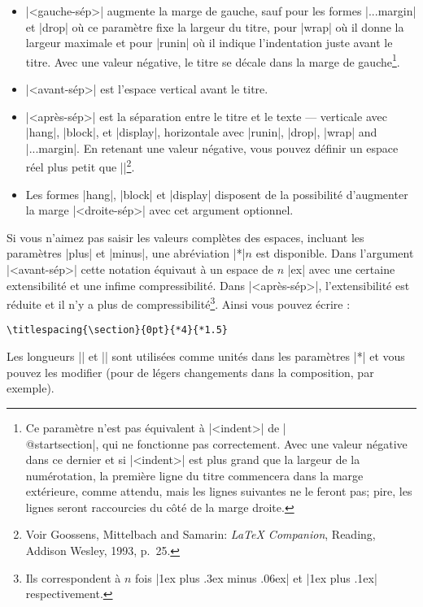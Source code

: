 \documentclass[a4paper]{ltxguide}
\def\gobble#1{}
\def\cs#1{\expandafter\gobble\string\\#1}
\begin{document}
\begin{itemize}
\item |<gauche-sép>| augmente la marge de gauche, sauf pour les formes
|...margin| et |drop| où ce paramètre fixe la largeur du titre, pour |wrap| où
il donne la largeur maximale et pour |runin| où il indique l'indentation juste 
avant le titre. Avec une valeur négative, le titre se décale dans la marge de 
gauche\footnote{Ce paramètre n'est pas équivalent à |<indent>| de 
|\cs{@startsection}|, qui ne fonctionne pas correctement. Avec une valeur
négative dans ce dernier et si |<indent>| est plus grand que la largeur de la
numérotation, la première ligne du titre commencera dans la marge extérieure,
comme attendu, mais les lignes suivantes ne le feront pas; pire, les lignes
seront raccourcies du côté de la marge droite.}.

\item |<avant-sép>| est l'espace vertical avant le titre.

\item |<après-sép>| est la séparation entre le titre et le texte --- verticale 
avec |hang|, |block|, et |display|, horizontale avec |runin|, |drop|, |wrap| 
and |...margin|. En retenant une valeur négative, vous pouvez définir un
espace réel plus petit que |\parskip|\footnote{Voir 
Goossens, Mittelbach and Samarin: \textit{\LaTeX{} Companion}, 
Reading, Addison Wesley, 1993, p.~25.}.

\item Les formes |hang|, |block| et |display| disposent de la possibilité 
d'augmenter la marge |<droite-sép>| avec cet argument optionnel.
\end{itemize}

Si vous n'aimez pas saisir les valeurs complètes des espaces, incluant les
paramètres |plus| et |minus|, une abréviation |*|$n$ est disponible. Dans 
l'argument |<avant-sép>| cette notation équivaut à un espace de $n$ |ex| 
avec une certaine extensibilité et une infime compressibilité. Dans  
|<après-sép>|, l'extensibilité est réduite et il n'y a plus de 
compressibilité\footnote{Ils correspondent à $n$ fois |1ex plus .3ex minus 
.06ex| et |1ex plus .1ex| respectivement.}. Ainsi vous pouvez écrire :
\begin{verbatim}
\titlespacing{\section}{0pt}{*4}{*1.5}
\end{verbatim}
Les longueurs |\beforetitleunit| et |\aftertitleunit| sont utilisées 
comme unités dans les paramètres |*| et vous pouvez les modifier (pour de 
légers changements dans la composition, par exemple).
\end{document}
